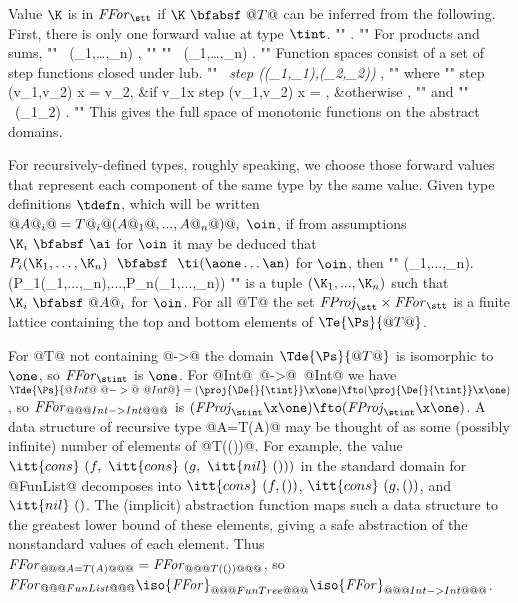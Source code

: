 \documentclass[11pt]{article}
\begin{document}
Value $\K$ is in ${\it{}FFor}_{\stt}$ if $\K~\bfabsf~@T@$ can be
inferred from the following.
First, there is only one forward value at type $\tint$.
""
	\axm{() {} \bfabsf {} \tint} .
""
For products and sums,
""
\
{(\K_1,\ldots,\K_n) {} \bfabsf {} \tprod} ,
""
""
\
{(\K_1,\ldots,\K_n) { } \bfabsf {} \tsum} .
""
Function spaces consist of a set of step functions closed under lub.
""
\
{\it{}step ((\A_1,\K_1),(\A_2,\K_2)) {} \bfabsf {} \tfunp} ,
""
where
""
	step (v_1,v_2) x = v_2,		&{\rm if} v_1\we{}x 
	step (v_1,v_2) x = \bot,	&{\rm otherwise} ,
""
and
""
\
{(\K_1\lub\K_2) {} \bfabsf {} \tfunp} .
""
This gives the full space of monotonic functions on the abstract
domains.

For recursively-defined types, roughly speaking, we choose those
forward values that represent each component of the same type by the
same value.  Given type definitions $\tdefn$, which will be written
$@A@_i@ = T@_i@(A@_1@,...,A@_n@)@,\ \oin$, if from assumptions
$\K_i~\bfabsf~\ai$ for $\oin$ it may be deduced that
$P_i(\K_1,\ldots,\K_n)~~\bfabsf~~\ti(\aone\ldots\an)$ for $\oin$, then
""
	\mu(\K_1,...,\K_n).(P_1(\K_1,...,\K_n),...,P_n(\K_1,...,\K_n))
""
is a tuple $(\K_1,...,\K_n)$ such that $\K_i\ \bfabsf\ @A@_i$
for $\oin$.
For all @T@ the set ${\it{}FProj}_{\stt}\times{\it{}FFor}_{\stt}$ is a 
finite lattice containing the top and bottom elements of $\Te{\Ps}{@T@}$.

For @T@ not containing @->@ the domain $\Tde{\Ps}{@T@}$ is isomorphic
to $\one$, so ${\it{}FFor}_{\stint}$ is $\one$.  For @Int@\ @->@\ @Int@
we have
$\Tde{\Ps}{@Int@\ @->@\ @Int@}=(\proj{\De{}{\tint}}\x\one)\fto(\proj{\De{}{\tint}}\x\one)$,
so ${\it{}FFor}_{@@@Int->Int@@@}$ is
$({\it{}FProj}_{\stint}\x\one)\fto({\it{}FProj}_{\stint}\x\one)$.  A
data structure of recursive type @A=T(A)@ may be thought of as some
(possibly infinite) number of elements of @T(())@.  For example, the
value $\itt{cons}\ (f,\ \itt{cons}\ (g,\ \itt{nil}\ ()))$ in the
standard domain for @FunList@ decomposes into $\itt{cons}\ (f,())$,
$\itt{cons}\ (g,())$, and $\itt{nil}\ ()$.  The (implicit) abstraction
function maps such a data structure to the greatest lower bound of
these elements, giving a safe abstraction of the nonstandard values of
each element.  Thus
${\it{}FFor}_{@@@A=T(A)@@@}={\it{}FFor}_{@@@T(())@@@}$, so
${\it{}FFor}_{@@@FunList@@@}\iso{\it{}FFor}_{@@@FunTree@@@}\iso{\it{}FFor}_{@@@Int->Int@@@}$.
\end{document}
